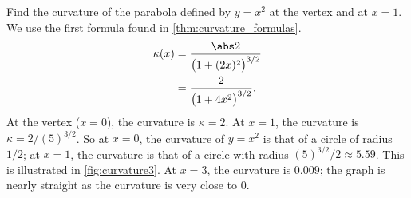 
\begin{example}\label{ex_curvature3}
Find the curvature of the parabola defined by $y=x^2$ at the vertex and at $x=1$.
\solution
We use the first formula found in \autoref{thm:curvature_formulas}. 
\begin{align*}
\kappa(x) &= \frac{\abs 2}{\bigl(1+(2x)^2\bigr)^{3/2}} \\
			&= \frac2{\bigl(1+4x^2\bigr)^{3/2}}.
\end{align*}
At the vertex ($x=0$), the curvature is $\kappa = 2$. At $x=1$, the curvature is $\kappa = 2/(5)^{3/2}$. So at $x=0$, the curvature of $y=x^2$ is that of a circle of radius $1/2$; at $x=1$, the curvature is that of a circle with radius $(5)^{3/2}/2\approx 5.59$. This is illustrated in \autoref{fig:curvature3}. At $x=3$, the curvature is $0.009$; the graph is nearly straight as the curvature is very close to 0.
\end{example}

